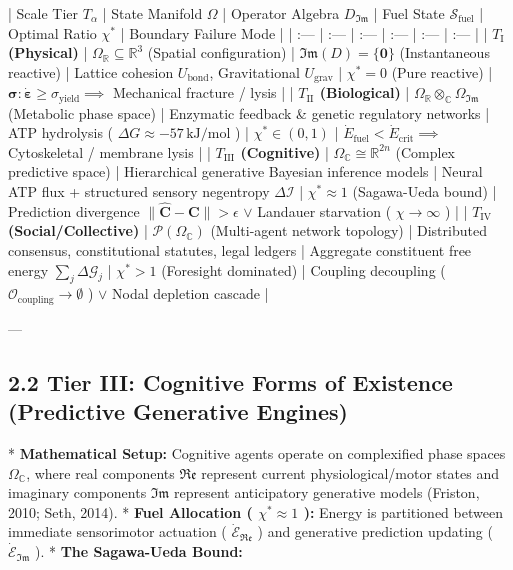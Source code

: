 \documentclass[11pt,a4paper]{article}
\theoremstyle{definition}
\theoremstyle{remark}
\begin{document}
| Scale Tier $T_\alpha$ | State Manifold $\Omega$ | Operator Algebra $D_{\mathfrak{Im}}$ | Fuel State $\mathcal{S}_{\text{fuel}}$ | Optimal Ratio $\chi^*$ | Boundary Failure Mode |
| :--- | :--- | :--- | :--- | :--- | :--- |
| \textbf{$T_{\text{I}}$ (Physical)} | $\Omega_{\mathbb{R}} \subseteq \mathbb{R}^3$ (Spatial configuration) | $\mathfrak{Im}(D) = \{\mathbf{0}\}$ (Instantaneous reactive) | Lattice cohesion $U_{\text{bond}}$, Gravitational $U_{\text{grav}}$ | $\chi^* = 0$ (Pure reactive) | $\boldsymbol{\sigma}:\dot{\boldsymbol{\varepsilon}} \ge \sigma_{\text{yield}} \implies$ Mechanical fracture / lysis |
| \textbf{$T_{\text{II}}$ (Biological)} | $\Omega_{\mathbb{R}} \otimes_{\mathbb{C}} \Omega_{\mathfrak{Im}}$ (Metabolic phase space) | Enzymatic feedback \& genetic regulatory networks | ATP hydrolysis ( $\Delta G \approx -57 \, \text{kJ/mol}$ ) | $\chi^* \in (0, 1)$ | $\dot{E}_{\text{fuel}} < \dot{E}_{\text{crit}} \implies$ Cytoskeletal / membrane lysis |
| \textbf{$T_{\text{III}}$ (Cognitive)} | $\Omega_{\mathbb{C}} \cong \mathbb{R}^{2n}$ (Complex predictive space) | Hierarchical generative Bayesian inference models | Neural ATP flux + structured sensory negentropy $\Delta \mathcal{I}$ | $\chi^* \approx 1$ (Sagawa-Ueda bound) | Prediction divergence $\|\hat{\mathbf{C}} - \mathbf{C}\| > \epsilon$ $\lor$ Landauer starvation ( $\chi \to \infty$ ) |
| \textbf{$T_{\text{IV}}$ (Social/Collective)} | $\mathcal{P}(\Omega_{\mathbb{C}})$ (Multi-agent network topology) | Distributed consensus, constitutional statutes, legal ledgers | Aggregate constituent free energy $\sum_j \Delta \mathcal{G}_j$ | $\chi^* > 1$ (Foresight dominated) | Coupling decoupling ( $\mathcal{O}_{\text{coupling}} \to \emptyset$ ) $\lor$ Nodal depletion cascade |

---

\subsection{2.2 Tier III: Cognitive Forms of Existence (Predictive Generative Engines)}
* \textbf{Mathematical Setup:} Cognitive agents operate on complexified phase spaces $\Omega_{\mathbb{C}}$, where real components $\mathfrak{Re}$ represent current physiological/motor states and imaginary components $\mathfrak{Im}$ represent anticipatory generative models (Friston, 2010; Seth, 2014).
* \textbf{Fuel Allocation ( $\chi^* \approx 1$ ):} Energy is partitioned between immediate sensorimotor actuation ( $\dot{\mathcal{E}}_{\mathfrak{Re}}$ ) and generative prediction updating ( $\dot{\mathcal{E}}_{\mathfrak{Im}}$ ).
* \textbf{The Sagawa-Ueda Bound:}
\end{document}
